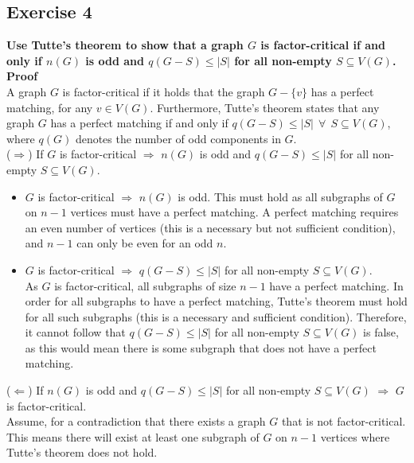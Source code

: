 \subsection*{Exercise 4}
\boldmath
\textbf{Use Tutte’s theorem to show that a graph $G$ is factor-critical if and only if $n(G)$ is odd and
$q(G-S) \leq |S|$ for all non-empty $S \subseteq V (G)$.} \\
\unboldmath
\linebreak 
\textbf{Proof} \\
A graph $G$ is factor-critical if it holds that the graph $G - \{v\}$ has a perfect matching, for any $v \in V(G)$. Furthermore, Tutte's theorem states that any graph $G$ has a perfect matching if and only if $q(G-S) \leq |S| \:\: \forall \:\: S \subseteq V(G)$, where $q(G)$ denotes the number of odd components in $G$. \\
\linebreak 
\boldmath ($\Rightarrow$) \unboldmath If $G$ is factor-critical $\Rightarrow$ $n(G)$ is odd and $q(G-S) \leq |S|$ for all non-empty $S \subseteq V (G)$. 
\begin{itemize}
    \item $G$ is factor-critical $\Rightarrow$ $n(G)$ is odd. This must hold as all subgraphs of $G$ on $n-1$ vertices must have a perfect matching. A perfect matching requires an even number of vertices (this is a necessary but not sufficient condition), and $n-1$ can only be even for an odd $n$. 
    \item $G$ is factor-critical $\Rightarrow$ $q(G-S) \leq |S|$ for all non-empty $S \subseteq V(G)$. \\
    As $G$ is factor-critical, all subgraphs of size $n-1$ have a perfect matching. In order for all subgraphs to have a perfect matching, Tutte's theorem must hold for all such subgraphs (this is a necessary and sufficient condition). Therefore, it cannot follow that $q(G-S) \leq |S|$ for all non-empty $S \subseteq V(G)$ is false, as this would mean there is some subgraph that does not have a perfect matching. 
\end{itemize}
\boldmath ($\Leftarrow$) \unboldmath If $n(G)$ is odd and $q(G-S) \leq |S|$ for all non-empty $S \subseteq V(G)$ $\Rightarrow$ $G$ is factor-critical. \\
\linebreak 
Assume, for a contradiction that there exists a graph $G$ that is not factor-critical. This means there will exist at least one subgraph of $G$ on $n-1$ vertices where Tutte's theorem does not hold. \\
